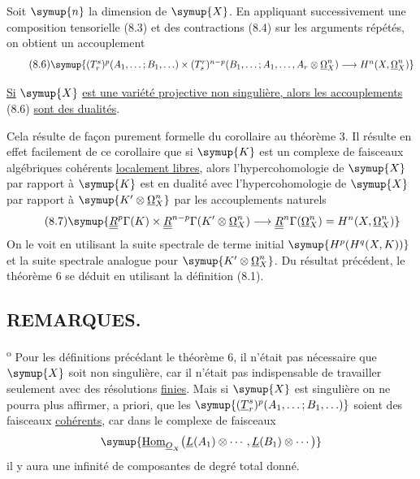 Soit $\symup{n}$ la dimension de $\symup{X}$. En appliquant successivement une composition
tensorielle (8.3) et des contractions (8.4) sur les arguments répétés, on
obtient un accouplement
\begin{equation}\tag{8.6}
\resizebox{\textwidth}{!}{$\symup{
  (T_{r}^{s})^{p}(A_1,\ldots;B_1,\ldots)
  \times
  (T_{s}^{r})^{n-p}(B_1,\ldots;A_1,\ldots,A_r\otimes\underline{\Omega}_X^{n})
  \longrightarrow H^{n}(X,\underline{\Omega}_X^{n})
}$}
\end{equation}

 \uline{Si} $\symup{X}$ \uline{est une variété projective non singulière, alors
les accouplements} (8.6) \uline{sont des dualités}.

Cela résulte de façon purement formelle du corollaire au théorème 3. Il résulte
en effet facilement de ce corollaire que si $\symup{K}$ est un complexe de faisceaux
algébriques cohérents \uline{localement libres}, alors l'hypercohomologie de $\symup{X}$ par
rapport à $\symup{K}$ est en dualité avec l'hypercohomologie de $\symup{X}$ par rapport à
$\symup{K'\otimes\underline{\Omega}_X^{n}}$ par les accouplements naturels
\begin{equation}\tag{8.7}
  \symup{\underline{\underline{R}}^{p}\Gamma(K)
  \times\underline{\underline{R}}^{n-p}\Gamma(K'\otimes\underline{\Omega}_X^{n})
  \longrightarrow\underline{\underline{R}}^{n}\Gamma(\underline{\Omega}_X^{n})
  =H^{n}(X,\underline{\Omega}_X^{n})}
\end{equation}
On le voit en utilisant la suite spectrale de terme initial
$\symup{H^{p}(H^{q}(X,K))}$ et la suite spectrale analogue pour
$\symup{K'\otimes\underline{\Omega}_X^{n}}$. Du résultat précédent, le théorème 6 se déduit en
utilisant la définition (8.1).

\subsection*{\normalfont REMARQUES.}

\textsuperscript{o} Pour les définitions précédant le théorème 6,
il n'était pas nécessaire que $\symup{X}$ soit non singulière, car il n'était pas
indispensable de travailler seulement avec des résolutions \uline{finies}. Mais si $\symup{X}$
est singulière on ne pourra plus affirmer, a priori, que les
$\symup{(\underline{T}_{r}^{s})^{p}(A_1,\ldots;B_1,\ldots)}$ soient des faisceaux
\uline{cohérents}, car dans le complexe de faisceaux
\[
  \symup{\Homsh_{\Osh_X}\bigl(\underline{L}(A_1)\otimes\cdots,\underline{L}(B_1)\otimes\cdots\bigr)}
\]
il y aura une infinité de composantes de degré total donné.

